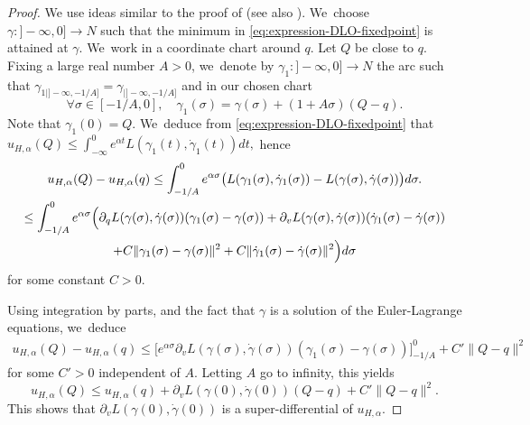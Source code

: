 \documentclass[10pt]{amsart}
\theoremstyle{definition}
\begin{document}
\begin{proof} We use ideas similar to the proof of \cite[Prop.\,4.11.1]{Fathi-book} (see also \cite{Bernard2008}). We~choose $\gamma:{}]-\infty, 0]\to N$ such that the minimum in \eqref{eq:expression-DLO-fixedpoint} is attained at $\gamma$. We~work in a coordinate chart around $q$. Let $Q$ be close to $q$.
Fixing a large real number $A>0$, we~denote by $\gamma_1:{}]-\infty, 0]\to N$ the arc such that $\gamma_{1|]-\infty, -1/A]}=\gamma_{|]-\infty, -1/A]}$ and in our chosen chart
\[
\forall\sigma\in [-1/A, 0],\quad \gamma_1(\sigma)=\gamma(\sigma)+(1+A\sigma)(Q-q).
\]
Note that $\gamma_1(0)=Q$. We~deduce from \eqref{eq:expression-DLO-fixedpoint} that $ u_{H, \alpha}(Q)\leq \int_{-\infty}^0 e^{\alpha t}L(\gamma_1 (t), \dot \gamma_1 (t))dt ,$
hence
\begin{multline*}
u_{H, \alpha}(Q) - u_{H, \alpha}(q) \leq \int_{-1/A}^0e^{\alpha \sigma}\bigl(L(\gamma_1(\sigma), \dot\gamma_1(\sigma))-L(\gamma(\sigma), \dot\gamma(\sigma))\bigr)d\sigma.\\
\leq \int_{-1/A}^0e^{\alpha \sigma}\Bigl(\partial_qL(\gamma(\sigma), \dot\gamma(\sigma))(\gamma_1(\sigma)-\gamma(\sigma))+\partial_vL(\gamma(\sigma), \dot\gamma(\sigma))(\dot\gamma_1(\sigma)-\dot\gamma(\sigma))\\
+C\| \gamma_1(\sigma)-\gamma(\sigma)\|^2+C\| \dot\gamma_1(\sigma)-\dot\gamma(\sigma)\|^2\Bigr)d\sigma
\end{multline*}
for some constant $C>0$.

Using integration by parts, and the fact that $\gamma$ is a solution of the Euler-Lagrange equations, we~deduce
\begin{align*} u_{H, \alpha}(Q)- u_{H, \alpha}(q)
\leq \Big[ e^{\alpha\sigma}\partial_vL(\gamma(\sigma), \dot\gamma(\sigma))(\gamma_1(\sigma)-\gamma(\sigma))\Big]_{-1/A}^0+C'\| Q-q\|^2
\end{align*}
for some $C'>0$ independent of $A$. Letting $A$ go to infinity, this yields
\[
u_{H, \alpha}(Q)\leq u_{H, \alpha}(q)+\partial_vL(\gamma(0), \dot\gamma(0))(Q-q)+C'\| Q-q\|^2.
\]
This shows that $\partial_vL(\gamma(0), \dot\gamma(0))$ is a super-differential of $u_{H, \alpha}$.
\end{proof}
\end{document}
